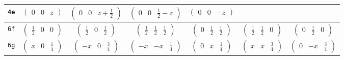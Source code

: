 \documentclass[fleqn,9pt,landscape]{jsarticle}
\begin{document}
\begin{center}
\begin{longtable}{ccccccc}
{\tt 4e} & $ \begin{pmatrix} 0 & 0 & z \end{pmatrix} $ & $ \begin{pmatrix} 0 & 0 & z + \frac{1}{2} \end{pmatrix} $ & $ \begin{pmatrix} 0 & 0 & \frac{1}{2} - z \end{pmatrix} $ & $ \begin{pmatrix} 0 & 0 & - z \end{pmatrix} $ & $  $ & $  $ \\ \hline
{\tt 6f} & $ \begin{pmatrix} \frac{1}{2} & 0 & 0 \end{pmatrix} $ & $ \begin{pmatrix} \frac{1}{2} & 0 & \frac{1}{2} \end{pmatrix} $ & $ \begin{pmatrix} \frac{1}{2} & \frac{1}{2} & \frac{1}{2} \end{pmatrix} $ & $ \begin{pmatrix} 0 & \frac{1}{2} & \frac{1}{2} \end{pmatrix} $ & $ \begin{pmatrix} \frac{1}{2} & \frac{1}{2} & 0 \end{pmatrix} $ & $ \begin{pmatrix} 0 & \frac{1}{2} & 0 \end{pmatrix} $ \\ \hline
{\tt 6g} & $ \begin{pmatrix} x & 0 & \frac{1}{4} \end{pmatrix} $ & $ \begin{pmatrix} - x & 0 & \frac{3}{4} \end{pmatrix} $ & $ \begin{pmatrix} - x & - x & \frac{1}{4} \end{pmatrix} $ & $ \begin{pmatrix} 0 & x & \frac{1}{4} \end{pmatrix} $ & $ \begin{pmatrix} x & x & \frac{3}{4} \end{pmatrix} $ & $ \begin{pmatrix} 0 & - x & \frac{3}{4} \end{pmatrix} $ \\ \hline

\end{longtable}
\end{center}
\end{document}
